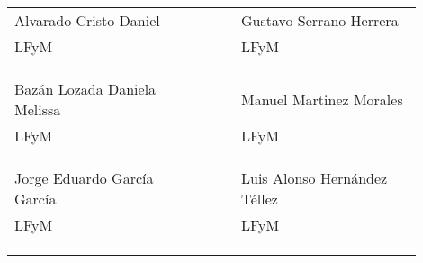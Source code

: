 \documentclass[11pt,a4paper,sans]{moderncv}        %
\begin{document}
\begin{center}
    \begin{tabular}{ P{0.4\linewidth} P{0.1\linewidth}  P{0.4\linewidth} }
        Alvarado Cristo Daniel & \quad & Gustavo Serrano Herrera \\
        LFyM & & LFyM \\
        & & \\
        & & \\  
        & & \\ 
        Bazán Lozada Daniela Melissa & \quad & Manuel Martinez Morales \\
        LFyM & & LFyM \\
        & & \\
        & & \\  
        & & \\
        Jorge Eduardo García García & \quad & Luis Alonso Hernández Téllez \\
        LFyM & & LFyM \\
        & & \\
        & & \\  
        & & \\
    \end{tabular}
\end{center}
\end{document}
